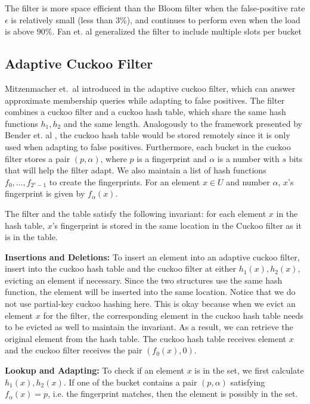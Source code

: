 \documentclass[../paper.tex]{subfiles}
\begin{document}
The filter is more space efficient than the Bloom filter when the false-positive rate $\epsilon$ is relatively small (less than $3\%$), and continues to perform even when the load is above $90\%$.
Fan et. al generalized the filter to include multiple slots per bucket

\subsection{Adaptive Cuckoo Filter}
Mitzenmacher et.\ al introduced in \cite{adaptive-cuckoo} the adaptive cuckoo filter, which can answer approximate membership queries while adapting to false positives. The filter combines a cuckoo filter and a cuckoo hash table,
which share the same hash functions $h_1,h_2$ and the same length. Analogously to the framework presented by Bender et. al \cite{broom-filter}, the cuckoo hash table would be stored remotely since it is only used when adapting to false positives.
Furthermore, each bucket in the cuckoo filter stores a pair $(p,\alpha)$, where $p$ is a fingerprint and $\alpha$ is a number with $s$ bits that will help the filter adapt. We also maintain a list of hash functions $f_0,\ldots,f_{2^s-1}$ to create the fingerprints. For an element $x\in U$ and number $\alpha$, $x$'s fingerprint is given by $f_\alpha(x)$.

The filter and the table satisfy the following invariant: for each element $x$ in the hash table, $x$'s fingerprint is stored in the same location in the Cuckoo filter as it is in the table.

\textbf{Insertions and Deletions:} To insert an element into an adaptive cuckoo filter, insert into the cuckoo hash table and the cuckoo filter at either $h_1(x),h_2(x)$, evicting an element if necessary.
Since the two structures use the same hash function, the element will be inserted into the same location. Notice that we do not use partial-key cuckoo hashing here. This is okay because when we evict an element $x$ for the filter, the corresponding element in the cuckoo hash table needs to be evicted as well
to maintain the invariant. As a result, we can retrieve the original element from the hash table.  The cuckoo hash table receives element $x$ and the cuckoo filter receives the pair $(f_0(x),0)$.

\textbf{Lookup and Adapting:} To check if an element $x$ is in the set, we first calculate $h_1(x), h_2(x)$. If one of the bucket contains a pair $(p,\alpha)$ satisfying $f_\alpha(x)=p$, i.e. the fingerprint matches, then the element is possibly in the set.
\end{document}
